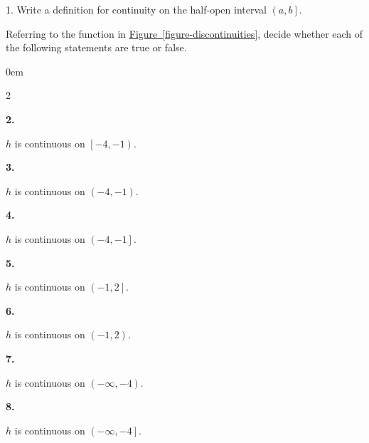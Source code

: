 \documentclass[12pt,]{book}
\theoremstyle{plain}
\theoremstyle{definition}
\numberwithin{equation}{section}
\newenvironment{exercisegroup}%
{\medskip\noindent}%
{\par\bigskip}%
\newlength{\exercisegroupindent}%
\newlength{\exercisegroupitemwidth}%
\newenvironment{exercisegrouplist}%
{\vspace{-\partopsep}%
\begin{adjustwidth}{\exercisegroupindent}{0em}}%
{\end{adjustwidth}%
\vspace{-\partopsep}%
\vspace{\baselineskip}}%
\newenvironment{exercisegroupbycol}[1]%
{\begin{exercisegrouplist}%
\vspace{-\multicolsep}%
\begin{multicols}{#1}%
\setlength{\parindent}{0em}%
\setlength{\exercisegroupitemwidth}{\linewidth}}%
{\end{multicols}%
\vspace{-\multicolsep}%
\end{exercisegrouplist}}%
\newenvironment{exercisegroupitem}[1]%
{\begin{minipage}[t]{\exercisegroupitemwidth}
\vspace{0pt}%
{\bfseries#1}%
\rule{0pt}{\baselineskip}}{\strut%
\end{minipage}%
\hspace{\columnsep}}%
\providecommand\phantomsection{}
\newcommand{\ointerval}[2]{\left(#1,#2\right)}
\newcommand{\cointerval}[2]{\left[\left.#1,#2\right)\right.}
\newcommand{\ocinterval}[2]{\left(\left.#1,#2\right]\right.}
\begin{document}
\begin{exerciselist}
\item[1.]\phantomsection\hypertarget{exercise-96}{\null}Write a definition for continuity on the half-open interval \(\ocinterval{a}{b}\).%
\par\smallskip
\end{exerciselist}
\begin{exercisegroup}%
Referring to the function in \hyperref[figure-discontinuities]{Figure~\ref*{figure-discontinuities}}, decide whether each of the following statements are true or false.%
\begin{exercisegroupbycol}{2}%
\begin{exercisegroupitem}{2. }\phantomsection\hypertarget{exercise-97}{\null}
\(h\) is continuous on \(\cointerval{-4}{-1}\).%
\end{exercisegroupitem}%
\par%
\begin{exercisegroupitem}{3. }\phantomsection\hypertarget{exercise-98}{\null}
\(h\) is continuous on \(\ointerval{-4}{-1}\).%
\end{exercisegroupitem}%
\par%
\begin{exercisegroupitem}{4. }\phantomsection\hypertarget{exercise-99}{\null}
\(h\) is continuous on \(\ocinterval{-4}{-1}\).%
\end{exercisegroupitem}%
\par%
\begin{exercisegroupitem}{5. }\phantomsection\hypertarget{exercise-100}{\null}
\(h\) is continuous on \(\ocinterval{-1}{2}\).%
\end{exercisegroupitem}%
\par%
\begin{exercisegroupitem}{6. }\phantomsection\hypertarget{exercise-101}{\null}
\(h\) is continuous on \(\ointerval{-1}{2}\).%
\end{exercisegroupitem}%
\par%
\begin{exercisegroupitem}{7. }\phantomsection\hypertarget{exercise-102}{\null}
\(h\) is continuous on \(\ointerval{-\infty}{-4}\).%
\end{exercisegroupitem}%
\par%
\begin{exercisegroupitem}{8. }\phantomsection\hypertarget{exercise-103}{\null}
\(h\) is continuous on \(\ocinterval{-\infty}{-4}\).%
\end{exercisegroupitem}%
\par%
\end{exercisegroupbycol}%
\end{exercisegroup}%
\end{document}
